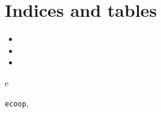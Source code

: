 \documentclass[letterpaper,10pt,english]{sphinxmanual}
\begin{document}
\chapter{Indices and tables}
\label{index:indices-and-tables}\begin{itemize}
\item {} 

\item {} 

\item {} 

\end{itemize}


\renewcommand{\indexname}{Python Module Index}
\begin{theindex}
\def\bigletter#1{{\Large\sffamily#1}\nopagebreak\vspace{1mm}}
\bigletter{e}
\item {\texttt{ecoop}}, \pageref{index:module-ecoop}
\end{theindex}

\renewcommand{\indexname}{Index}
\printindex
\end{document}
